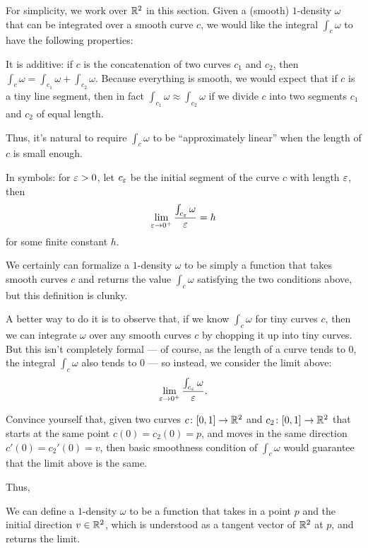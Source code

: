 For simplicity, we work over $\mathbb R^2$ in this section.
Given a (smooth) $1$-density $\omega$ that can be integrated over a smooth curve $c$,
we would like the integral $\int_c \omega$ to have the following properties:
\begin{itemize}
	\ii It is additive: if $c$ is the concatenation of two curves $c_1$ and $c_2$, then
	$\int_c \omega = \int_{c_1} \omega + \int_{c_2} \omega$.
	\ii Because everything is smooth, we would expect that if $c$ is a tiny line segment,
	then in fact $\int_{c_1} \omega \approx \int_{c_2} \omega$ if we divide $c$ into two segments
	$c_1$ and $c_2$ of equal length.

	Thus, it's natural to require $\int_c \omega$ to be ``approximately linear'' when the length of
	$c$ is small enough.

	In symbols: for $\varepsilon > 0$, let $c_\varepsilon$ be the initial segment of the curve $c$ with length
	$\varepsilon$, then
	\[ \lim_{\varepsilon \to 0^+} \frac{\int_{c_\varepsilon} \omega}{\varepsilon} = h \]
	for some finite constant $h$.
\end{itemize}

We certainly can formalize a $1$-density $\omega$ to be simply a function that takes smooth curves
$c$ and returns the value $\int_c \omega$ satisfying the two conditions above, but this definition
is clunky.

A better way to do it is to observe that, if we know $\int_c \omega$ for tiny curves $c$, then we
can integrate $\omega$ over any smooth curves $c$ by chopping it up into tiny curves.
But this isn't completely formal --- of course, as the length of a curve tends to $0$, the integral
$\int_c \omega$ also tends to 0 --- so instead, we consider the limit above:
\[ \lim_{\varepsilon \to 0^+} \frac{\int_{c_\varepsilon} \omega}{\varepsilon}. \]

\begin{ques}
	Convince yourself that, given two curves $c \colon [0, 1] \to \mathbb R^2$ and $c_2 \colon [0, 1] \to
	\mathbb R^2$ that starts at the same point $c(0) = c_2(0) = p$,
	and moves in the same direction $c'(0) = c_2'(0) = v$, then basic smoothness condition of
	$\int_c \omega$ would guarantee that the limit above is the same.
\end{ques}

Thus,
\begin{moral}
We can define a $1$-density $\omega$ to be a function that takes in a point $p$ and the initial
direction $v \in \mathbb R^2$, which is understood as a tangent vector of $\mathbb R^2$ at $p$, and returns
the limit.
\end{moral}

